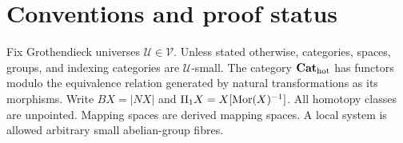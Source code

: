 \documentclass[11pt,a4paper]{article}
\theoremstyle{definition}\newtheorem{definition}[theorem]{Definition}
\theoremstyle{remark}\newtheorem{remark}[theorem]{Remark}
\newcommand{\U}{\mathcal U}\newcommand{\V}{\mathcal V}
\begin{document}
\section{Conventions and proof status}
Fix Grothendieck universes $\U\in\V$. Unless stated otherwise, categories, spaces, groups, and indexing categories are $\U$-small. The category ${\mathbf{Cat}_{\mathrm{hot}}}$ has functors modulo the equivalence relation generated by natural transformations as its morphisms. Write $BX=|NX|$ and $\Pi_1X=X[\operatorname{Mor}(X)^{-1}]$. All homotopy classes are unpointed. Mapping spaces are derived mapping spaces. A local system is allowed arbitrary small abelian-group fibres.
\begingroup
\small


\endgroup
\end{document}
